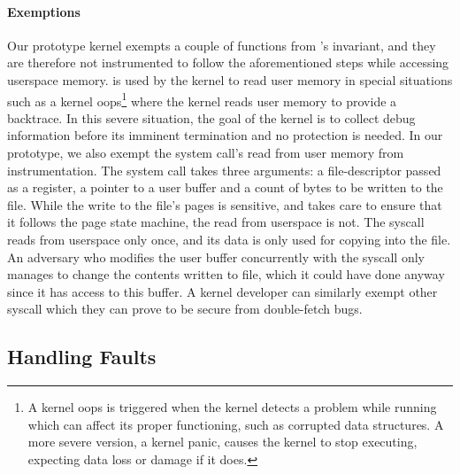 \documentclass[letterpaper,twocolumn,10pt]{article}
\begin{document}
\paragraph{Exemptions}
Our prototype \tiktok kernel exempts a couple of functions 
from \tiktok's invariant, and they are therefore not instrumented 
to follow the aforementioned steps while accessing userspace
memory. 
 is used by the kernel to 
read user memory in special situations such as a kernel 
oops\footnote{A kernel oops is triggered when the kernel detects a 
problem while running which can affect its proper functioning, such 
as corrupted data structures. 
A more severe version, a kernel panic, causes the kernel to stop 
executing, expecting data loss or damage if it does.}
where the kernel reads user memory to provide a backtrace. 
In this severe situation, the goal of the kernel is to collect debug 
information before its imminent termination and no \tocttou protection 
is needed.
In our prototype, we also exempt the  system 
call's read from user memory from instrumentation.
The  system call takes three arguments: a 
file-descriptor passed as a register, a pointer to a user 
buffer and a count of bytes to be written to the file.
While the write to the file's pages is sensitive, and 
\tiktok takes care to ensure that it follows the page state 
machine, the read from userspace is not. 
The syscall reads from userspace only once, and its data 
is only used for copying into the file.
An adversary who modifies the user buffer concurrently with 
the syscall only manages to change the contents written to 
file, which it could have done anyway since it has access to 
this buffer.
A kernel developer can similarly exempt other syscall which 
they can prove to be secure from double-fetch bugs.


\subsection{Handling Faults}
\end{document}
